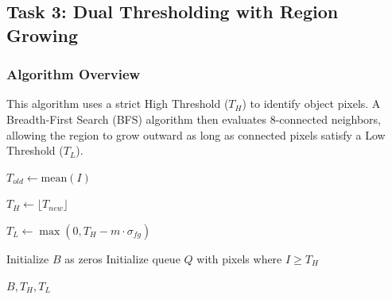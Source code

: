 \documentclass[11pt, letterpaper]{article}
\begin{document}
\subsection{Task 3: Dual Thresholding with Region Growing}
\subsubsection{Algorithm Overview}
This algorithm uses a strict High Threshold ($T_H$) to identify object pixels. A Breadth-First Search (BFS) algorithm then evaluates 8-connected neighbors, allowing the region to grow outward as long as connected pixels satisfy a Low Threshold ($T_L$). 

\begin{algorithm}[H]
\DontPrintSemicolon
{}


$T_{old} \leftarrow \text{mean}(I)$\;


$T_H \leftarrow \lfloor T_{new} \rfloor$\;

$T_L \leftarrow \max(0, T_H - m \cdot \sigma_{fg})$\;

Initialize $B$ as zeros\;
Initialize queue $Q$ with pixels where $I \ge T_H$\;



\Return $B, T_H, T_L$\;
\caption{Dual Thresholding with Region Growing}
\end{algorithm}
\end{document}
